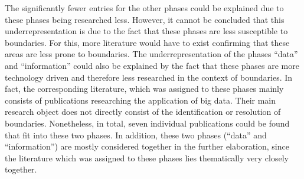The significantly fewer entries for the other phases could be explained due to these phases being researched less. However, it cannot be concluded that this underrepresentation is due to the fact that these phases are less susceptible to boundaries. For this, more literature would have to exist confirming that these areas are less prone to boundaries. The underrepresentation of the phases \enquote{data} and \enquote{information} could also be explained by the fact that these phases are more technology driven and therefore less researched in the context of boundaries. In fact, the corresponding literature, which was assigned to these phases mainly consists of publications researching the application of big data. Their main research object does not directly consist of the identification or resolution of boundaries. Nonetheless, in total, seven individual publications could be found that fit into these two phases. In addition, these two phases (\enquote{data} and \enquote{information}) are mostly considered together in the further elaboration, since the literature which was assigned to these phases lies thematically very closely together.

